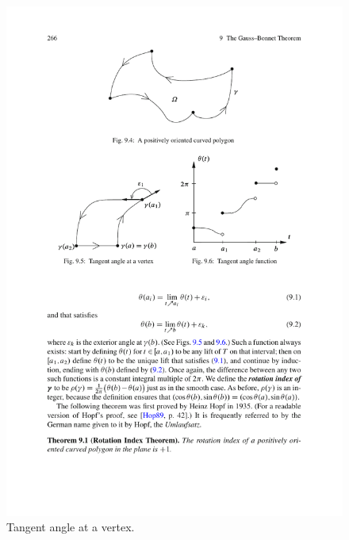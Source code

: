 \begin{figure}[htbp]
\centering
\begin{minipage}[b]{200pt}
\centering
\includegraphics{pictures/tangent-angle}
\caption{Tangent angle at a vertex.}
\end{minipage}
\hspace{20pt}
\begin{minipage}[b]{200pt}
\centering

\end{minipage}
\end{figure}
